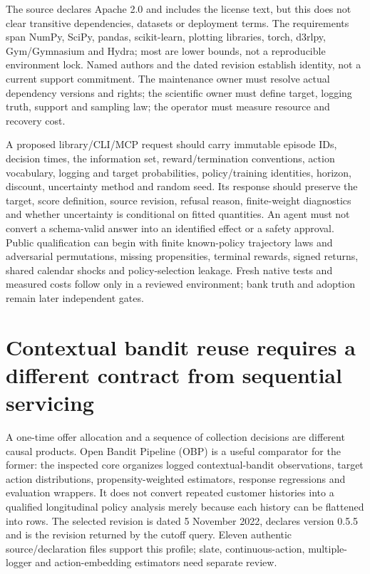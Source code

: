 The source declares Apache 2.0 and includes the license text, but this does not
clear transitive dependencies, datasets or deployment terms. The requirements
span NumPy, SciPy, pandas, scikit-learn, plotting libraries, torch, d3rlpy,
Gym/Gymnasium and Hydra; most are lower bounds, not a reproducible environment
lock. Named authors and the dated revision establish identity, not a current
support commitment. The maintenance owner must resolve actual dependency
versions and rights; the scientific owner must define target, logging truth,
support and sampling law; the operator must measure resource and recovery cost.
\cite{exec23_scope_rl_sources}

A proposed library/CLI/MCP request should carry immutable episode IDs, decision
times, the information set, reward/termination conventions, action vocabulary,
logging and target probabilities, policy/training identities, horizon, discount,
uncertainty method and random seed. Its response should preserve the target,
score definition, source revision, refusal reason, finite-weight diagnostics and
whether uncertainty is conditional on fitted quantities. An agent must not
convert a schema-valid answer into an identified effect or a safety approval.
Public qualification can begin with finite known-policy trajectory laws and
adversarial permutations, missing propensities, terminal rewards, signed returns,
shared calendar shocks and policy-selection leakage. Fresh native tests and
measured costs follow only in a reviewed environment; bank truth and adoption
remain later independent gates.


\section{Contextual bandit reuse requires a different contract from sequential servicing}
\label{exec23:obp-scope}
A one-time offer allocation and a sequence of collection decisions are different
causal products. Open Bandit Pipeline (OBP) is a useful comparator for the former:
the inspected core organizes logged contextual-bandit observations, target
action distributions, propensity-weighted estimators, response regressions and
evaluation wrappers. It does not convert repeated customer histories into a
qualified longitudinal policy analysis merely because each history can be
flattened into rows. The selected revision is dated 5 November 2022, declares
version 0.5.5 and is the revision returned by the cutoff query. Eleven authentic
source/declaration files support this profile; slate, continuous-action,
multiple-logger and action-embedding estimators need separate review.
\cite{exec23_obp_sources}

